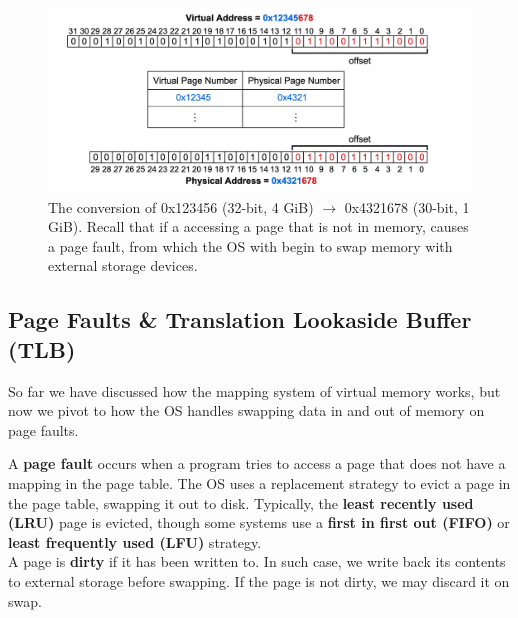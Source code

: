 \begin{figure}[h]
    \centering
    \includegraphics[width=\textwidth]{Sections/virt/conv.png}
    
    \vspace{1em}
    \caption{The conversion of 0x123456 (32-bit, 4 GiB) $\to$ 0x4321678 (30-bit, 1 GiB). Recall that if a accessing a page that is not in memory, causes a page fault, from which the OS with begin to swap memory with external storage devices.}
    
    \label{fig:virt5}
\end{figure}

\newpage 

\subsection{Page Faults \& Translation Lookaside Buffer (TLB)}

So far we have discussed how the mapping system of virtual memory works, but now we pivot to how the OS handles swapping data in and out of memory on page faults.

\begin{Def}

    A \textbf{page fault} occurs when a program tries to access a page that does not have a mapping in the page table. 
    The OS uses a replacement strategy to evict a page in the page table, swapping it out to disk. 
    Typically, the \textbf{least recently used (LRU)} page is evicted, though some systems use a \textbf{first in first out (FIFO)} or \textbf{least frequently used (LFU)} strategy.\\
    
    \noindent
    A page is \textbf{dirty} if it has been written to. In 
    such case, we write back its contents to external storage before swapping. If the page is not dirty, we may discard it on swap.
\end{Def}

